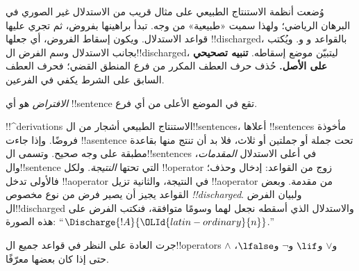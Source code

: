 \documentclass[../../../include/open-logic-section]{subfiles}
\begin{document}
      {}
      {}


\begin{explain}
وُضعت أنظمة الاستنتاج الطبيعي على مثال قريب من الاستدلال غير الصوري في البرهان الرياضي؛ ولهذا سميت «طبيعية» من وجه.
تبدأ براهينها بفروض، ثم تجري عليها قواعد الاستدلال.
ويكون إسقاط الفروض، أي جعلها !!{discharged}، بالقواعد
\Intro{\lnot} و\Intro{\lif} و.
ويُكتب بجانب الاستدلال وسم الفرض ال!!{discharged}، ليتبيّن موضع إسقاطه.
\textbf{تنبيه تصحيحي على الأصل.} حُذف حرف العطف المكرر من فرع المنطق
القضي؛ فحرف العطف السابق على الشرط يكفي في الفرعين.
\end{explain}

\begin{defn}[الافتراض]
\emph{الافتراض} هو أي !!{sentence} تقع في الموضع الأعلى من أي فرع.
\end{defn}

!!^{derivation}s الاستنتاج الطبيعي أشجار من ال!!{sentence}s، أعلاها
!!{sentence}s مأخوذة فروضًا. وإذا جاءت !!a{sentence} تحت جملة أو جملتين أو ثلاث، فلا بد أن تنتج منها بقاعدة مطبقة على وجه صحيح.
وتسمى ال!!{sentence}s في أعلى الاستدلال \emph{المقدمات}، وال!!{sentence} التي تحتها \emph{النتيجة}.
ولكل !!{operator} زوج من القواعد: إدخال وحذف؛ فالأولى تدخل
!!a{operator} في النتيجة، والثانية تزيل !!a{operator} من مقدمة.
وبعض القواعد يجيز أن يصير فرض من نوع مخصوص \emph{!!{discharged}}.
ولبيان الفرض ال!!{discharged} والاستدلال الذي أسقطه نجعل لهما وسومًا متوافقة، فنكتب الفرض على هذه الصورة:
``$\Discharge{!A}{{\OLId{latin-ordinary}{n}}}$.''


%
	{جرت العادة على النظر في قواعد جميع ال!!{operator}s $\land$ و$\lor$ و$\lif$ و$\lnot$ و$\lfalse$، حتى إذا كان بعضها معرّفًا.}
\end{document}
